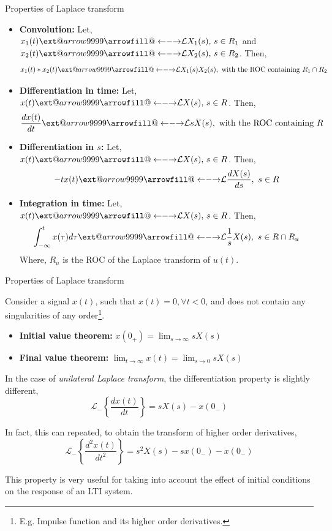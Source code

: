 \documentclass{beamer}
\makeatletter
\newcommand\xleftrightarrow[2][]{%
  \ext@arrow 9999{\longleftrightarrowfill@}{#1}{#2}}
\newcommand\longleftrightarrowfill@{%
  \arrowfill@\leftarrow\relbar\rightarrow}
\makeatother
\begin{document}
\begin{frame}{Properties of Laplace transform}

\begin{itemize}
\item \textbf{Convolution:} Let, $x_1(t) \xleftrightarrow{\mathcal{L}} X_1(s), \, s \in R_1$ and $x_2(t) \xleftrightarrow{\mathcal{L}} X_2(s), \, s \in R_2$. Then,
\vspace{-3mm}
\[ x_1(t) * x_2(t) \xleftrightarrow{\mathcal{L}} X_1(s)X_2(s), \,\, \text{with the ROC containing } R_1 \cap R_2 \]

\item \textbf{Differentiation in time:} Let, $x(t) \xleftrightarrow{\mathcal{L}} X(s), \, s \in R$. Then,
\vspace{-3mm}
\[ \frac{dx(t)}{dt} \xleftrightarrow{\mathcal{L}} sX(s), \,\, \text{with the ROC containing } R \]

\item \textbf{Differentiation in $s$:} Let, $x(t) \xleftrightarrow{\mathcal{L}} X(s), \, s \in R$. Then,
\vspace{-3mm}
\[ -tx(t) \xleftrightarrow{\mathcal{L}} \frac{dX(s)}{ds}, \,\, s \in R \]

\item \textbf{Integration in time:} Let, $x(t) \xleftrightarrow{\mathcal{L}} X(s), \, s \in R$. Then,
\vspace{-3mm}
\[ \int_{-\infty}^{t}x(\tau)d\tau \xleftrightarrow{\mathcal{L}} \frac{1}{s}X(s), \,\, s  \in R \cap R_u \]
Where, $R_u$ is the ROC of the Laplace transform of $u(t)$.
\end{itemize}

\end{frame}

\begin{frame}{Properties of Laplace transform}

Consider a signal $x(t)$, such that $x(t) = 0, \forall t < 0$, and does not contain any singularities of any order\footnote{E.g. Impulse function and its higher order derivatives.}.
\begin{itemize}
\item \textbf{Initial value theorem:} $x\left(0_{+}\right) = \lim_{s \to \infty}sX(s)$
\item \textbf{Final value theorem:} $\lim_{t \to \infty}x\left(t\right) = \lim_{s \to 0}sX(s)$
\end{itemize}

In the case of \textit{unilateral Laplace transform}, the differentiation property is slightly different,
\vspace{-3mm}
\[ \mathcal{L_{-}}\left\lbrace \frac{dx(t)}{dt}\right\rbrace = sX(s) - x(0_{-}) \]

In fact, this can repeated, to obtain the transform of higher order derivatives,
\vspace{-3mm} 
\[ \mathcal{L_{-}}\left\lbrace \frac{d^2x(t)}{dt^2}\right\rbrace = s^2X(s) - sx(0_{-}) - \dot{x}(0_{-}) \]

This property is very useful for taking into account the effect of initial conditions on the response of an LTI system.
\end{frame}
\end{document}
